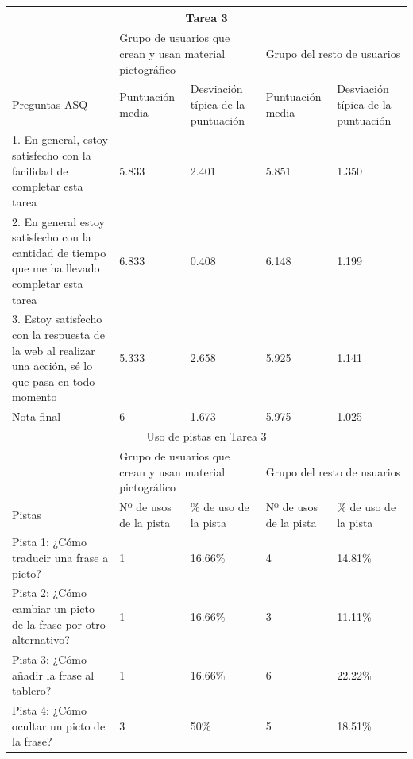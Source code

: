 \begin{tabular}{ |p{4cm}|p{2cm}|p{2cm}|p{2cm}|p{2cm}|  }
	\hline
	\multicolumn{5}{|c|}{Tarea 3} \\
	\hline
	& \multicolumn{2}{|p{4cm}|}{Grupo de usuarios que crean y usan material pictográfico} & \multicolumn{2}{|p{4cm}|}{Grupo del resto de usuarios }  \\ 
	\hline
	Preguntas ASQ & Puntuación media  &Desviación típica de la puntuación & Puntuación media & Desviación típica de la puntuación\\
	\hline
	1. En general, estoy satisfecho con la facilidad de completar esta tarea &5.833  &2.401 &5.851  &1.350\\
	\hline
	2. En general estoy satisfecho con la cantidad de tiempo que me ha llevado completar esta tarea &6.833  &0.408 &6.148 &1.199\\
	\hline
	3. Estoy satisfecho con la respuesta de la web al realizar una acción, sé lo que pasa en todo momento &5.333 &2.658 &5.925  &1.141\\
	\hline
	Nota final &6 &1.673 &5.975 &1.025\\
	\hline
	\multicolumn{5}{|c|}{Uso de pistas en Tarea 3} \\
	\hline
	& \multicolumn{2}{|p{4cm}|}{Grupo de usuarios que crean y usan material pictográfico} & \multicolumn{2}{|p{4cm}|}{Grupo del resto de usuarios }  \\ 
	\hline
	Pistas &Nº de usos de la pista &\% de uso de la pista&Nº de usos de la pista&\% de uso de la pista\\
	\hline
	Pista 1: ¿Cómo traducir una frase a picto? &1  &16.66\% &4  &14.81\%\\
	\hline
	Pista 2: ¿Cómo cambiar un picto de la frase por otro alternativo? &1  &16.66\%  &3 &11.11\%\\
	\hline
	Pista 3: ¿Cómo añadir la frase al tablero? &1 &16.66\% &6   &22.22\%\\
	\hline
	Pista 4: ¿Cómo ocultar un picto de la frase? &3 &50\% &5   &18.51\%\\
	\hline
\end{tabular}

